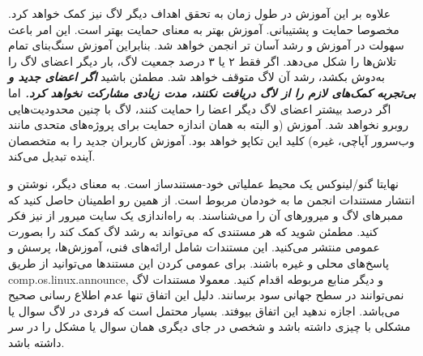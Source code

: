 علاوه بر این آموزش در طول زمان به تحقق اهداف دیگر لاگ نیز کمک خواهد کرد.
مخصوصا حمایت و پشتیبانی. آموزش بهتر به معنای حمایت بهتر است.
این امر باعث سهولت در آموزش و رشد آسان تر انجمن خواهد شد.
بنابراین آموزش سنگ‌بنای تمام تلاش‌ها را شکل می‌دهد.
اگر فقط ۲ یا ۳ درصد جمعیت لاگ، بار دیگر اعضای لاگ را به‌دوش بکشد،
رشد آن لاگ متوقف خواهد شد. مطمئن باشید
{\bfseries {\itshape
اگر اعضای جدید و بی‌تجربه کمک‌های لازم را از لاگ دریافت نکنند، مدت زیادی مشارکت نخواهد کرد.
}}
اما اگر درصد بیشتر اعضای لاگ دیگر اعضا را حمایت کنند، لاگ با چنین محدودیت‌هایی روبرو نخواهد شد.
آموزش (و البته به همان اندازه حمایت برای پروژه‌های متحدی مانند وب‌سرور آپاچی،
 غیره) کلید این تکاپو خواهد بود. آموزش کاربران جدید را به متخصصان آینده تبدیل می‌کند.

نهایتا گنو/لینوکس یک محیط عملیاتی خود-مستندساز است.
به معنای دیگر، نوشتن و انتشار مستندات انجمن ما به خودمان مربوط است.
از همین رو اطمینان حاصل کنید که ممبر‌های لاگ
و میرورهای آن را می‌شناسند.
به راه‌اندازی یک سایت میرور از  نیز فکر کنید.
مطمئن شوید که هر مستندی که می‌تواند به رشد لاگ کمک کند را
بصورت عمومی منتشر می‌کنید. این مستندات شامل ارائه‌های فنی، آموزش‌ها،
پرسش و پاسخ‌های محلی و غیره باشند. برای عمومی کردن این مستندها می‌توانید
از طریق
{\ttfamily comp.os.linux.announce}, 
و دیگر منابع مربوطه اقدام کنید.
معمولا مستندات لاگ نمی‌توانند در سطح جهانی سود برسانند. دلیل این اتفاق
تنها عدم اطلاع رسانی صحیح می‌باشد. اجازه ندهید این اتفاق بیوفتد.
بسیار محتمل است که فردی در لاگ سوال یا مشکلی با چیزی داشته باشد
و شخصی در جای دیگری همان سوال یا مشکل را در سر داشته باشد.
 
